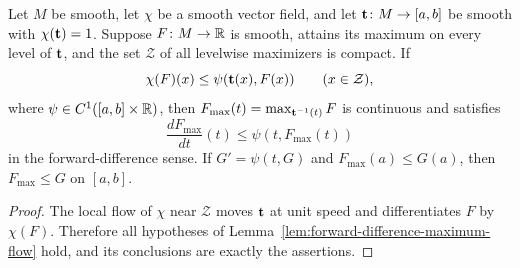 \begin{proposition}
\label{prop:forward-difference-maximum}


\label{fordiffmax}




Let $M$ be smooth, let $\chi$ be a smooth vector field, and let
${\bf t}\colon M\to[a,b]$ be smooth with $\chi({\bf t})=1$. Suppose
$F\colon M\to\mathbb{R}$ is smooth, attains its maximum on every level of
${\bf t}$, and the set $\mathcal Z$ of all levelwise maximizers is
compact. If
$$\chi(F)(x)\le\psi({\bf t}(x),F(x))\qquad(x\in\mathcal Z),$$
where $\psi\in C^1([a,b]\times\mathbb{R})$, then
$F_{\max}(t)=\max_{{\bf t}^{-1}(t)}F$ is continuous and satisfies
$$\frac{dF_{\max}}{dt}(t)\le\psi(t,F_{\max}(t))$$
in the forward-difference sense. If $G'=\psi(t,G)$ and
$F_{\max}(a)\le G(a)$, then $F_{\max}\le G$ on $[a,b]$.
\end{proposition}
\begin{proof}
\sketch

The local flow of $\chi$ near $\mathcal Z$ moves ${\bf t}$ at unit
speed and differentiates $F$ by $\chi(F)$. Therefore all hypotheses of
Lemma~\ref{lem:forward-difference-maximum-flow} hold, and its conclusions
are exactly the assertions.
\end{proof}
